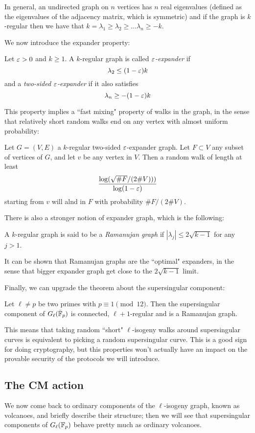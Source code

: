 In general, an undirected graph on $n$ vertices has $n$ real eigenvalues (defined as the eigenvalues of the adjacency matrix, which is symmetric) and if the graph is $k$-regular then we have that $k=\lambda_1\ge\lambda_2\ge\dots \lambda_n\ge -k$.

We now introduce the expander property:
\begin{definition}
    Let $\varepsilon>0$ and $k\ge1$. A $k$-regular graph is called \emph{$\varepsilon$-expander} if
    $$\lambda_2\le(1-\varepsilon)k$$
    and a \emph{two-sided $\varepsilon$-expander} if it also satisfies 
    $$\lambda_n\ge-(1-\varepsilon)k$$
\end{definition}

This property implies a ``fast mixing" property of walks in the graph, in the sense that relatively short random walks end on any vertex with almost uniform probability:
\begin{proposition}
    Let $G=(V,E)$ a $k$-regular two-sided $\varepsilon$-expander graph. Let $F\subset V$ any subset of vertices of $G$, and let $v$ be any vertex in $V$. Then a random walk of length at least $$\frac{\log(\sqrt{\# F}/(2\# V)))}{\log(1-\varepsilon)}$$ starting from $v$ will alnd in $F$ with probability $\# F / (2\# V)$.
\end{proposition}

There is also a stronger notion of expander graph, which is the following:
\begin{definition}
    A $k$-regular graph is said to be a \emph{Ramanujan graph} if $|\lambda_j|\le2\sqrt{k-1}$ for any $j>1$.
\end{definition}
It can be shown that Ramanujan graphs are the ``optimal" expanders, in the sense that bigger expander graph get close to the $2\sqrt{k-1}$ limit.

Finally, we can upgrade the theorem about the supersingular component:
\begin{theorem}
    Let $\ell\neq p$ be two primes with $p\equiv1\pmod{12}$. Then the supersingular component of $G_\ell(\bar{\mathbb{F}}_p)$ is connected, $\ell+1$-regular and is a Ramanujan graph.
\end{theorem}
This means that taking random ``short" $\ell$-isogeny walks around supersingular curves is equivalent to picking a random supersingular curve. This is a good sign for doing cryptography, but this properties won't actually have an impact on the provable security of the protocols we will introduce.

\subsection{The CM action}
We now come back to ordinary components of the $\ell$-isogeny graph, known as volcanoes, and briefly describe their structure; then we will see that supersingular components of $G_\ell(\mathbb{F}_p)$ behave pretty much as ordinary volcanoes.

